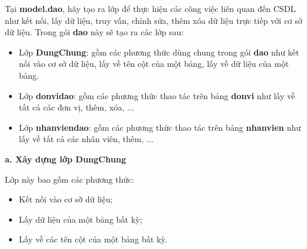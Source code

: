 Tại \textbf{model.dao}, hãy tạo ra lớp để thực hiện các công việc liên quan đến CSDL như kết nối, lấy dữ liệu, truy vấn, chỉnh sửa, thêm xóa dữ liệu trực tiếp với cơ sở dữ liệu. Trong gói \textbf{dao} này sẽ tạo ra các lớp sau:
\begin{itemize}
	\item Lớp \textbf{DungChung}: gồm các phương thức dùng chung trong gói \textbf{dao}  như kết nối vào cơ sở dữ liệu, lấy về tên cột của một bảng, lấy về dữ liệu của một bảng.
	\item Lớp \textbf{donvidao}: gồm các phương thức thao tác trên bảng \textbf{donvi} như lấy về tất cả các đơn vị, thêm, xóa, ...
	\item Lớp \textbf{nhanviendao}: gồm các phương thức thao tác trên bảng \textbf{nhanvien} như lấy về tất cả các nhân viên, thêm, ...
\end{itemize}
\textbf{ a. Xây dựng lớp DungChung}
 
 Lớp này bao gồm các phương thức:
\begin{itemize}
	\item Kết nối vào cơ sỡ dữ liệu;
	\item Lấy dữ liệu của một bảng bất kỳ;
	\item Lấy về các tên cột của một bảng bất kỳ.
\end{itemize}

